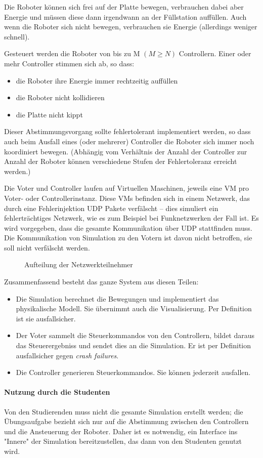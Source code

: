 Die Roboter k{\"{o}}nnen sich frei auf der Platte bewegen, verbrauchen dabei aber Energie und m{\"{u}}ssen diese dann irgendwann
an der F{\"{u}}llstation auff{\"{u}}llen. Auch wenn die Roboter sich nicht bewegen, verbrauchen sie Energie (allerdings weniger
schnell).

Gesteuert werden die Roboter von bis zu \gls{M} $(M \geq N)$ Controllern. Einer oder mehr Controller stimmen sich ab,
so dass:
\begin{itemize}
\item die Roboter ihre Energie immer rechtzeitig auff{\"{u}}llen
\item die Roboter nicht kollidieren
\item die Platte nicht kippt
\end{itemize}

Dieser Abstimmungsvorgang sollte fehlertolerant implementiert werden, so dass auch beim Ausfall eines (oder mehrerer) Controller die Roboter sich immer noch koordiniert bewegen.
(Abh{\"{a}}ngig vom Verh{\"{a}}ltnis der Anzahl der Controller zur Anzahl der Roboter k{\"{o}}nnen verschiedene Stufen der Fehlertoleranz erreicht werden.\cite[s.149]{Werner00})

Die Voter und Controller laufen auf Virtuellen Maschinen, jeweils eine VM pro Voter- oder Controllerinstanz.
Diese VMs befinden sich in einem Netzwerk, das durch eine Fehlerinjektion UDP Pakete verf{\"{a}}lscht --
dies simuliert ein fehlertr{\"{a}}chtiges Netzwerk, wie es zum Beispiel bei Funknetzwerken der Fall ist.
Es wird vorgegeben, dass die gesamte Kommunikation {\"{u}}ber UDP stattfinden muss. Die Kommunikation von Simulation zu den Votern ist davon nicht betroffen, sie soll nicht verf{\"{a}}lscht werden.

\begin{figure}
	\centering
	\caption{Aufteilung der Netzwerkteilnehmer}
	\label{fig:network}
\end{figure}

Zusammenfassend besteht das ganze System aus diesen Teilen:
\begin{itemize}
	\item Die Simulation berechnet die Bewegungen und implementiert das physikalische Modell. Sie {\"{u}}bernimmt auch die Visualisierung. Per Definition ist sie ausfallsicher.
	\item Der Voter sammelt die Steuerkommandos von den Controllern, bildet daraus das Steuerergebniss und sendet dies an die Simulation. Er ist per Definition ausfallsicher gegen \textit{crash failures}.
	\item Die Controller generieren Steuerkommandos. Sie k{\"{o}}nnen jederzeit ausfallen.
\end{itemize}

\paragraph{Nutzung durch die Studenten} Von den Studierenden muss nicht die gesamte Simulation erstellt werden; die {\"{U}}bungsaufgabe bezieht sich nur auf die Abstimmung zwischen den Controllern und die Ansteuerung der Roboter.
Daher ist es notwendig, ein Interface ins "Innere" der Simulation bereitzustellen, das dann von den Studenten genutzt wird.
